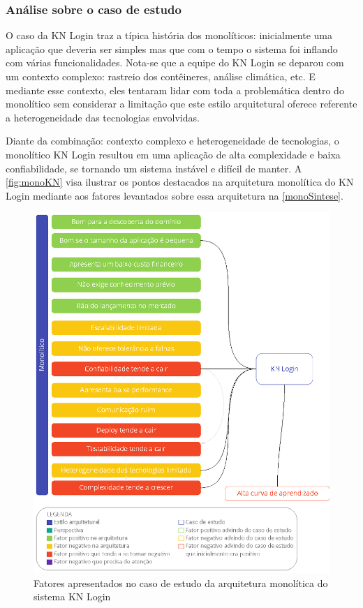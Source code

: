 \subsubsection{Análise sobre o caso de estudo}

O caso da KN Login traz a típica história dos monolíticos: inicialmente uma aplicação que deveria
ser simples mas que com o tempo o sistema foi inflando com várias funcionalidades. Nota-se que a
equipe do KN Login se deparou com um contexto complexo: rastreio dos contêineres, análise climática,
etc. E mediante esse contexto, eles tentaram lidar com toda a problemática dentro do monolítico sem
considerar a limitação que este estilo arquitetural oferece referente a heterogeneidade das
tecnologias envolvidas.

Diante da combinação: contexto complexo e heterogeneidade de tecnologias, o monolítico KN Login
resultou em uma aplicação de alta complexidade e baixa confiabilidade, se tornando um sistema
instável e difícil de manter. A \autoref{fig:monoKN} visa ilustrar os pontos destacados na
arquitetura monolítica do KN Login mediante aos fatores levantados sobre essa arquitetura na
\autoref{monoSintese}. 

\begin{figure}[h]
  \centering
  \includegraphics[keepaspectratio=true,scale=1]{figuras/analise-knlogin.eps}
  \caption{Fatores apresentados no caso de estudo da arquitetura monolítica do sistema KN Login\label{fig:monoKN}}
\end{figure}

